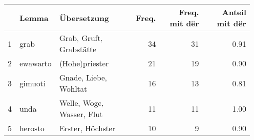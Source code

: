 \begin{tabular}{rllrrr}
  \hline
 & Lemma & Übersetzung & Freq. & Freq. mit dër & Anteil mit dër \\ 
  \hline
1 & grab & Grab, Gruft, Grabstätte &  34 &  31 & 0.91 \\ 
  2 & ewawarto & (Hohe)priester &  21 &  19 & 0.90 \\ 
  3 & gimuoti & Gnade, Liebe, Wohltat &  16 &  13 & 0.81 \\ 
  4 & unda & Welle, Woge, Wasser, Flut &  11 &  11 & 1.00 \\ 
  5 & herosto & Erster, Höchster &  10 &   9 & 0.90 \\ 
   \hline
\end{tabular}
